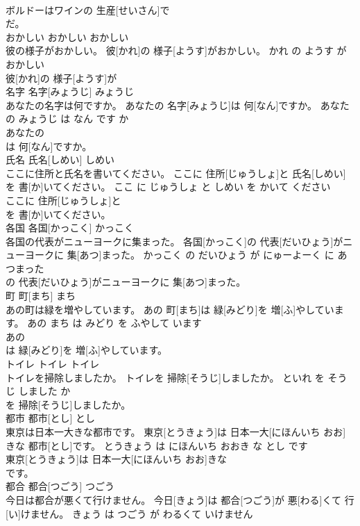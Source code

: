 \documentclass[8pt]{extreport}
\begin{document}
\begin{CJK}{UTF8}{min}
\\	ボルドーはワインの 生産[せいさん]で
\\	だ。			
\\	おかしい	おかしい	おかしい	
\\	彼の様子がおかしい。	彼[かれ]の 様子[ようす]がおかしい。	かれ の ようす が おかしい	
\\	彼[かれ]の 様子[ようす]が
\\	名字	名字[みょうじ]	みょうじ	
\\	あなたの名字は何ですか。	あなたの 名字[みょうじ]は 何[なん]ですか。	あなた の みょうじ は なん です か	
\\	あなたの
\\	は 何[なん]ですか。			
\\	氏名	氏名[しめい]	しめい	
\\	ここに住所と氏名を書いてください。	ここに 住所[じゅうしょ]と 氏名[しめい]を 書[か]いてください。	ここ に じゅうしょ と しめい を かいて ください	
\\	ここに 住所[じゅうしょ]と
\\	を 書[か]いてください。			
\\	各国	各国[かっこく]	かっこく	
\\	各国の代表がニューヨークに集まった。	各国[かっこく]の 代表[だいひょう]がニューヨークに 集[あつ]まった。	かっこく の だいひょう が にゅーよーく に あつまった	
\\	の 代表[だいひょう]がニューヨークに 集[あつ]まった。			
\\	町	町[まち]	まち	
\\	あの町は緑を増やしています。	あの 町[まち]は 緑[みどり]を 増[ふ]やしています。	あの まち は みどり を ふやして います	
\\	あの
\\	は 緑[みどり]を 増[ふ]やしています。			
\\	トイレ	トイレ	トイレ	
\\	トイレを掃除しましたか。	トイレを 掃除[そうじ]しましたか。	といれ を そうじ しました か	
\\	を 掃除[そうじ]しましたか。			
\\	都市	都市[とし]	とし	
\\	東京は日本一大きな都市です。	東京[とうきょう]は 日本一大[にほんいち おお]きな 都市[とし]です。	とうきょう は にほんいち おおき な とし です	
\\	東京[とうきょう]は 日本一大[にほんいち おお]きな
\\	です。			
\\	都合	都合[つごう]	つごう	
\\	今日は都合が悪くて行けません。	今日[きょう]は 都合[つごう]が 悪[わる]くて 行[い]けません。	きょう は つごう が わるくて いけません	

\end{CJK}
\end{document}
